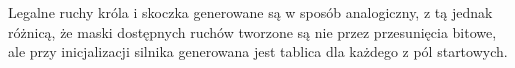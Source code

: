 Legalne ruchy króla i skoczka generowane są w sposób analogiczny, z tą jednak różnicą, że maski dostępnych ruchów tworzone są nie przez przesunięcia bitowe, ale przy inicjalizacji silnika generowana jest tablica dla każdego z pól startowych.

%
%
%


